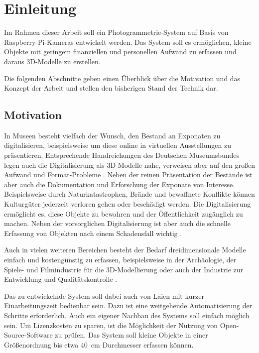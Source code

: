 \documentclass[./00PhotoBox]{subfiles}
\begin{document}
\chapter{Einleitung}
\label{c:einleitung}

Im Rahmen dieser Arbeit soll ein Photogrammetrie-System auf Basis von Raspberry-Pi-Kameras entwickelt werden. Das System soll es ermöglichen, kleine Objekte mit geringem finanziellen und personellen Aufwand zu erfassen und daraus 3D-Modelle zu erstellen.

Die folgenden Abschnitte geben einen Überblick über die Motivation und das Konzept der Arbeit und stellen den bisherigen Stand der Technik dar.

\section{Motivation}

In Museen besteht vielfach der Wunsch, den Bestand an Exponaten zu digitalisieren, beispielsweise um diese online in virtuellen Ausstellungen zu präsentieren. Entsprechende Handreichungen des Deutschen Museumsbundes legen auch die Digitalisierung als 3D-Modelle nahe, verweisen aber auf den großen Aufwand und Format-Probleme \citep[S. 43]{handreichung_digital}. Neben der reinen Präsentation der Bestände ist aber auch die Dokumentation und Erforschung der Exponate von Interesse. Beispielsweise durch Naturkatastrophen, Brände und bewaffnete Konflikte können Kulturgüter jederzeit verloren gehen oder beschädigt werden. Die Digitalisierung ermöglicht es, diese Objekte zu bewahren und der Öffentlichkeit zugänglich zu machen. Neben der vorsorglichen Digitalisierung ist aber auch die schnelle Erfassung von Objekten nach einem Schadensfall wichtig \citep{kulturgutretter}.

Auch in vielen weiteren Bereichen besteht der Bedarf dreidimensionale Modelle einfach und kostengünstig zu erfassen, beispielsweise in der Archäologie, der Spiele- und Filmindustrie für die 3D-Modellierung oder auch der Industrie zur Entwicklung und Qualitätskontrolle \citep[S. 37f]{luhmann}.

Das zu entwickelnde System soll dabei auch von Laien mit kurzer Einarbeitungszeit bedienbar sein. Dazu ist eine weitgehende Automatisierung der Schritte erforderlich. Auch ein eigener Nachbau des Systems soll einfach möglich sein. Um Lizenzkosten zu sparen, ist die Möglich\-keit der Nutzung von Open-Source-Software zu prüfen. Das System soll kleine Objekte in einer Größenordnung bis etwa \SI{40}{\centi\metre} Durchmesser erfassen können.
\end{document}
